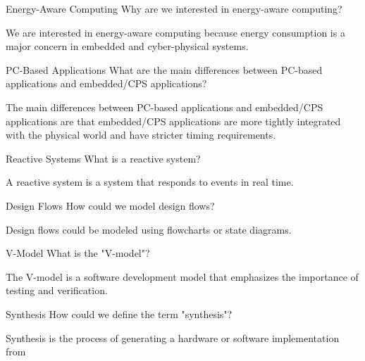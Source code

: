 \documentclass{article}
\begin{document}
\begin{exercise}{Energy-Aware Computing}
  Why are we interested in energy-aware computing?

  \begin{solution}
    We are interested in energy-aware computing because energy consumption is a major concern in embedded and cyber-physical systems.
  \end{solution}
\end{exercise}

\begin{exercise}{PC-Based Applications}
  What are the main differences between PC-based applications and embedded/CPS applications?

  \begin{solution}
    The main differences between PC-based applications and embedded/CPS applications are that embedded/CPS applications are more tightly integrated with the physical world and have stricter timing requirements.
  \end{solution}
\end{exercise}

\begin{exercise}{Reactive Systems}
  What is a reactive system?

  \begin{solution}
    A reactive system is a system that responds to events in real time.
  \end{solution}
\end{exercise}

\begin{exercise}{Design Flows}
  How could we model design flows?

  \begin{solution}
    Design flows could be modeled using flowcharts or state diagrams.
  \end{solution}
\end{exercise}

\begin{exercise}{V-Model}
  What is the "V-model"?

  \begin{solution}
    The V-model is a software development model that emphasizes the importance of testing and verification.
  \end{solution}
\end{exercise}

\begin{exercise}{Synthesis}
  How could we define the term "synthesis"?

  \begin{solution}
    Synthesis is the process of generating a hardware or software implementation from
  \end{solution}
\end{exercise}
\end{document}
